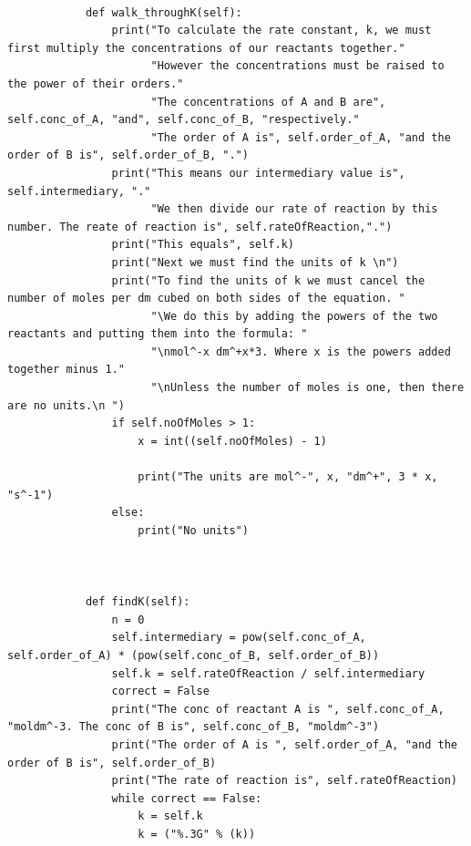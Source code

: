\documentclass[a4paper,12pt]{report}
\begin{document}
\begin{verbatim}
                
            def walk_throughK(self):
                print("To calculate the rate constant, k, we must first multiply the concentrations of our reactants together."
                      "However the concentrations must be raised to the power of their orders."
                      "The concentrations of A and B are", self.conc_of_A, "and", self.conc_of_B, "respectively."
                      "The order of A is", self.order_of_A, "and the order of B is", self.order_of_B, ".")
                print("This means our intermediary value is", self.intermediary, "."
                      "We then divide our rate of reaction by this number. The reate of reaction is", self.rateOfReaction,".")
                print("This equals", self.k)
                print("Next we must find the units of k \n")
                print("To find the units of k we must cancel the number of moles per dm cubed on both sides of the equation. "
                      "\We do this by adding the powers of the two reactants and putting them into the formula: "
                      "\nmol^-x dm^+x*3. Where x is the powers added together minus 1."
                      "\nUnless the number of moles is one, then there are no units.\n ")
                if self.noOfMoles > 1:
                    x = int((self.noOfMoles) - 1)
        
                    print("The units are mol^-", x, "dm^+", 3 * x, "s^-1")
                else:
                    print("No units")        
                
        
        
            def findK(self):
                n = 0
                self.intermediary = pow(self.conc_of_A, self.order_of_A) * (pow(self.conc_of_B, self.order_of_B))
                self.k = self.rateOfReaction / self.intermediary
                correct = False
                print("The conc of reactant A is ", self.conc_of_A, "moldm^-3. The conc of B is", self.conc_of_B, "moldm^-3")
                print("The order of A is ", self.order_of_A, "and the order of B is", self.order_of_B)
                print("The rate of reaction is", self.rateOfReaction)
                while correct == False:
                    k = self.k
                    k = ("%.3G" % (k))
                    

\end{verbatim}
\end{document}
